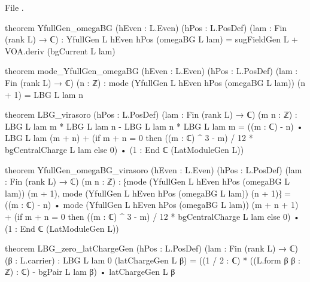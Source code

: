 \noindent File .
\begin{leancode}
theorem YfullGen_omegaBG (hEven : L.Even) (hPos : L.PosDef) (lam : Fin (rank L) → ℂ) :
    YfullGen L hEven hPos (omegaBG L lam)
      = sugFieldGen L + VOA.deriv (bgCurrent L lam)

theorem mode_YfullGen_omegaBG (hEven : L.Even) (hPos : L.PosDef) (lam : Fin (rank L) → ℂ)
    (n : ℤ) :
    mode (YfullGen L hEven hPos (omegaBG L lam)) (n + 1) = LBG L lam n

theorem LBG_virasoro (hPos : L.PosDef) (lam : Fin (rank L) → ℂ) (m n : ℤ) :
    LBG L lam m * LBG L lam n - LBG L lam n * LBG L lam m
      = ((m : ℂ) - n) • LBG L lam (m + n)
        + (if m + n = 0 then ((m : ℂ) ^ 3 - m) / 12 * bgCentralCharge L lam else 0)
            • (1 : End ℂ (LatModuleGen L))

theorem YfullGen_omegaBG_virasoro (hEven : L.Even) (hPos : L.PosDef)
    (lam : Fin (rank L) → ℂ) (m n : ℤ) :
    ⁅mode (YfullGen L hEven hPos (omegaBG L lam)) (m + 1),
      mode (YfullGen L hEven hPos (omegaBG L lam)) (n + 1)⁆
      = ((m : ℂ) - n) • mode (YfullGen L hEven hPos (omegaBG L lam)) (m + n + 1)
        + (if m + n = 0 then ((m : ℂ) ^ 3 - m) / 12 * bgCentralCharge L lam else 0)
            • (1 : End ℂ (LatModuleGen L))

theorem LBG_zero_latChargeGen (hPos : L.PosDef) (lam : Fin (rank L) → ℂ) (β : L.carrier) :
    LBG L lam 0 (latChargeGen L β)
      = ((1 / 2 : ℂ) * ((L.form β β : ℤ) : ℂ) - bgPair L lam β) • latChargeGen L β
\end{leancode}

